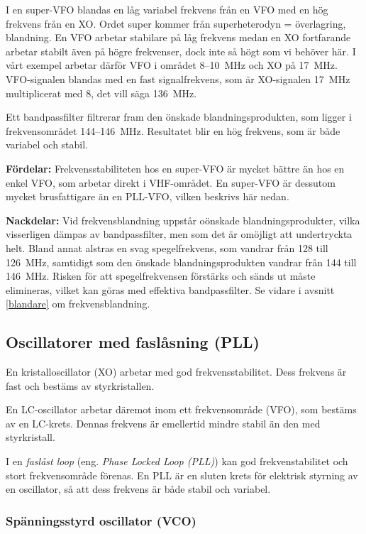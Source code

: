I en super-VFO blandas en låg variabel frekvens från en VFO med en hög
frekvens från en XO.
Ordet super kommer från superheterodyn = överlagring, blandning.
En VFO arbetar stabilare på låg frekvens medan en XO fortfarande arbetar
stabilt även på högre frekvenser, dock inte så högt som vi behöver här.
I vårt exempel arbetar därför VFO i området 8--10~MHz och XO på 17~MHz.
VFO-signalen blandas med en fast signalfrekvens, som är XO-signalen 17~MHz
multiplicerat med 8, det vill säga 136~MHz.

Ett bandpassfilter filtrerar fram den önskade blandningsprodukten, som
ligger i frekvensområdet 144--146~MHz.
Resultatet blir en hög frekvens, som är både variabel och stabil.

\textbf{Fördelar:}
Frekvensstabiliteten hos en super-VFO är mycket bättre än hos en enkel VFO,
som arbetar direkt i VHF-området.
En super-VFO är dessutom mycket brusfattigare än en PLL-VFO, vilken
beskrivs här nedan.

\textbf{Nackdelar:}
Vid frekvensblandning uppstår oönskade blandningsprodukter, vilka visserligen
dämpas av bandpassfilter, men som det är omöjligt att undertryckta helt.
Bland annat alstras en svag spegelfrekvens, som vandrar från 128 till 126~MHz,
samtidigt som den önskade blandningsprodukten vandrar från 144 till 146~MHz.
Risken för att spegelfrekvensen förstärks och sänds ut måste elimineras,
vilket kan göras med effektiva bandpassfilter.
Se vidare i avsnitt \ref{blandare} om frekvensblandning.

\subsection{Oscillatorer med faslåsning (PLL)}

En kristalloscillator (XO) arbetar med god frekvensstabilitet.
Dess frekvens är fast och bestäms av styrkristallen.

En LC-oscillator arbetar däremot inom ett frekvensområde (VFO), som bestäms av
en LC-krets.
Dennas frekvens är emellertid mindre stabil än den med styrkristall.

I en \emph{faslåst loop} (eng. \emph{Phase Locked Loop (PLL)}) kan god
frekvenstabilitet och stort frekvensområde förenas.
En PLL är en sluten krets för elektrisk styrning av en oscillator, så att dess
frekvens är både stabil och variabel.

\subsubsection{Spänningsstyrd oscillator (VCO)}

